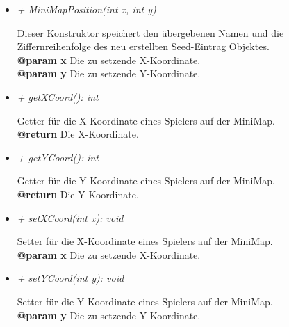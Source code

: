         \begin{itemize}
            \item \textit{+ MiniMapPosition(int x, int y)}
                \begin{leftbar}[0.9\linewidth]
                    Dieser Konstruktor speichert den übergebenen Namen und die 
                    Ziffernreihenfolge des neu erstellten Seed-Eintrag Objektes.\\
                    \textbf{@param x} Die zu setzende X-Koordinate.\\
                    \textbf{@param y} Die zu setzende Y-Koordinate.
                \end{leftbar}
            \item \textit{+ getXCoord(): int}
                \begin{leftbar}[0.9\linewidth]
                    Getter für die X-Koordinate eines Spielers auf 
                    der MiniMap.\\
                    \textbf{@return} Die X-Koordinate.
                \end{leftbar}
            \item \textit{+ getYCoord(): int}
                \begin{leftbar}[0.9\linewidth]
                    Getter für die Y-Koordinate eines Spielers auf 
                    der MiniMap.\\
                    \textbf{@return} Die Y-Koordinate.
                \end{leftbar}
            \item \textit{+ setXCoord(int x): void}
                \begin{leftbar}[0.9\linewidth]
                    Setter für die X-Koordinate eines Spielers auf 
                    der MiniMap.\\
                    \textbf{@param x} Die zu setzende X-Koordinate.
                \end{leftbar}
            \item \textit{+ setYCoord(int y): void}
                \begin{leftbar}[0.9\linewidth]
                    Setter für die Y-Koordinate eines Spielers auf 
                    der MiniMap.\\
                    \textbf{@param y} Die zu setzende Y-Koordinate.
                \end{leftbar}
        \end{itemize}

